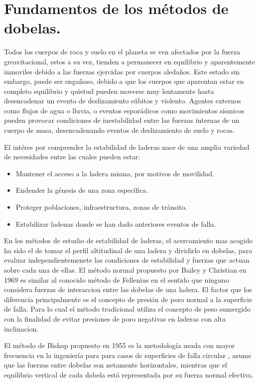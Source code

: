 \chapter{Fundamentos de los m\'etodos de dobelas.}

Todos los cuerpos de roca y suelo en el planeta se ven afectados por la fuerza greavitacional, estos a su vez, tienden a permanecer en equilibrio y aparentemente inmoviles debido a las fuerzas ejercidas por cuerpos aleda\~nos. Este estado sin embargo, puede ser enga\~noso, debido a que los cuerpos que aparentan estar en completo equilibrio y quietud pueden moverse muy lentamente hasta desencadenar un evento de deslizamiento s\'ubitos y violento.
Agentes externos como flujos de agua o lluvia, o eventos espor\'adicos como movimientos s\'ismicos pueden provocar condiciones de inestabilidad entre las fuerzas internas de un cuerpo de masa, desencadenando eventos de deslizamiento de suelo y rocas.

El int\'eres por comprender la estabilidad de laderas nace de una amplia variedad de necesidades entre las cuales pueden estar:

\begin{itemize}
  \item Mantener el acceso a la ladera misma, por motivos de movilidad.
  \item Endender la g\'enesis de una zona espec\'ifica.
  \item Proteger poblaciones, infraestructura, zonas de tr\'ansito.
  \item Estabilizar ladenas donde se han dado anteriores eventos de falla.
\end{itemize}

En los m\'etodos de estudio de estabilidad de laderas, el acercamiento mas acogido ha sido el de tomar el  perfil altitudinal de una ladera y dividirlo en dobelas, para evaluar independientemenete las condiciones de estabilidad y fuerzas que actuan sobre cada una de ellas.
El m\'etodo normal propuesto por Bailey y Christian en 1969 es similar al conocido m\'etodo de Fellenius en el sentido que ninguno considera fuerzas de interaccion entre las dobelas de una ladera.
El factor que los diferencia principalmente es el concepto de presi\'on de poro normal a la superficie de falla. Para lo cual el m\'etodo tradicional utiliza el concepto de peso sumergido con la finalidad de evitar presiones de poro negativas en laderas con alta inclinacion.

El m\'etodo de Bishop propuesto en 1955 es la metodolog\'ia usada con mayor frecuencia en la ingenier\'ia para para casos de superficies de falla circular \cite{huangB}, asume que las fuerzas entre dobelas son netamente horizontales, mientras que el equilibrio vertical de cada dobela est\'a representada por su fuerza normal efectiva.

